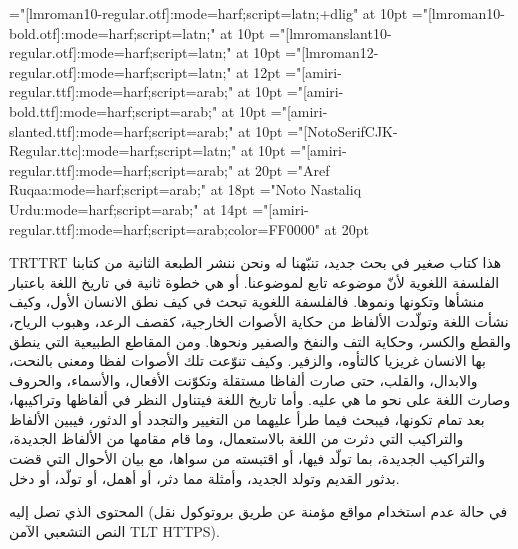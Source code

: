 

\def\mode{mode=node}
\def\mode{mode=harf}

\font\testr="[lmroman10-regular.otf]:\mode;script=latn;+dlig" at 10pt
\font\testb="[lmroman10-bold.otf]:\mode;script=latn;" at 10pt
\font\testi="[lmromanslant10-regular.otf]:\mode;script=latn;" at 10pt
\font\testR="[lmroman12-regular.otf]:\mode;script=latn;" at 12pt
\font\testA="[amiri-regular.ttf]:\mode;script=arab;" at 10pt
\font\testB="[amiri-bold.ttf]:\mode;script=arab;" at 10pt
\font\testI="[amiri-slanted.ttf]:\mode;script=arab;" at 10pt
\font\testF="[NotoSerifCJK-Regular.ttc]:\mode;script=latn;" at 10pt
\font\testa="[amiri-regular.ttf]:\mode;script=arab;" at 20pt
\font\ruqaa="Aref Ruqaa:\mode;script=arab;" at 18pt
\font\nasta="Noto Nastaliq Urdu:\mode;script=arab;" at 14pt
\font\testc="[amiri-regular.ttf]:\mode;script=arab;color=FF0000" at 20pt

\begingroup\pardir TRT\textdir TRT
\testA
هذا كتاب صغير في بحث جديد، تنبّهنا له ونحن ننشر الطبعة الثانية من كتابنا الفلسفة
اللغوية لأنّ موضوعه تابع لموضوعنا. أو هي خطوة ثانية في تاريخ اللغة باعتبار
منشأها وتكونها ونموها. فالفلسفة اللغوية تبحث في كيف نطق الانسان الأول، وكيف
نشأت اللغة وتولّدت الألفاظ من حكاية الأصوات الخارجية، ك{\testB قصف الرعد}، وهبوب الرياح،
والقطع والكسر، وحكاية التف والنفخ والصفير ونحوها. ومن المقاطع الطبيعية التي
ينطق بها الانسان غريزيا كالتأوه، والزفير. وكيف تنوّعت تلك الأصوات لفظا ومعنى
بالنحت، والابدال، والقلب، حتى صارت ألفاظا مستقلة وتكوّنت الأفعال، والأسماء،
والحروف وصارت اللغة على نحو ما هي عليه.  وأما تاريخ اللغة فيتناول النظر في
ألفاظها وتراكيبها، بعد تمام تكونها، فيبحث فيما طرأ عليهما من التغيير والتجدد أو
الدثور، فيبين الألفاظ والتراكيب التي دثرت من اللغة بالاستعمال، وما قام مقامها
من الألفاظ الجديدة، والتراكيب الجديدة، بما تولّد فيها، أو اقتبسته من سواها، مع
بيان الأحوال التي قضت بدثور القديم وتولد الجديد، وأمثلة مما دثر، أو أهمل، أو
تولّد، أو دخل.

المحتوى الذي تصل إليه (في حالة عدم استخدام مواقع مؤمنة عن طريق بروتوكول نقل
النص التشعبي الآمن {\textdir TLT HTTPS}).
\par\endgroup\vfill\eject

\def\arabictext{%
هذا كتاب صغير في بحث جديد، تنبّهنا له ونحن ننشر الطبعة الثانية من كتابنا الفلسفة
اللغوية لأنّ موضوعه تابع لموضوعنا. أو هي خطوة ثانية في تاريخ اللغة باعتبار
منشأها وتكونها ونموها. فالفلسفة اللغوية تبحث في كيف نطق الانسان الأول، وكيف
نشأت اللغة وتولّدت الألفاظ من حكاية الأصوات الخارجية، كقصف الرعد، وهبوب الرياح،
والقطع والكسر، وحكاية التف والنفخ والصفير ونحوها. ومن المقاطع الطبيعية التي
ينطق بها الانسان غريزيا كالتأوه، والزفير. وكيف تنوّعت تلك الأصوات لفظا ومعنى
بالنحت، والابدال، والقلب، حتى صارت ألفاظا مستقلة وتكوّنت الأفعال، والأسماء،
والحروف وصارت اللغة على نحو ما هي عليه.  وأما تاريخ اللغة فيتناول النظر في
ألفاظها وتراكيبها، بعد تمام تكونها، فيبحث فيما طرأ عليهما من التغيير والتجدد أو
الدثور، فيبين الألفاظ والتراكيب التي دثرت من اللغة بالاستعمال، وما قام مقامها
من الألفاظ الجديدة، والتراكيب الجديدة، بما تولّد فيها، أو اقتبسته من سواها، مع
بيان الأحوال التي قضت بدثور القديم وتولد الجديد، وأمثلة مما دثر، أو أهمل، أو
تولّد، أو دخل.%
}

